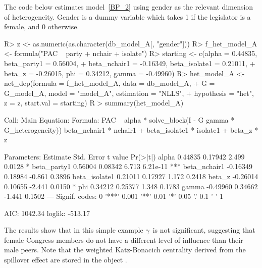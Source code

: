 \documentclass[nojss]{jss}
\begin{document}
The code below estimates model~\ref{BP_2} using gender as the
relevant dimension of heterogeneity. Gender is a dummy variable
which takes 1 if the legislator is a female, and 0 otherwise. 
\begin{CodeChunk}
\begin{CodeInput}
R> z <- as.numeric(as.character(db_model_A[, "gender"]))
R> f_het_model_A <- formula("PAC ~ party + nchair + isolate")
R> starting <- c(alpha = 0.44835, beta_party1 = 0.56004,
+    beta_nchair1 = -0.16349, beta_isolate1 = 0.21011,
+    beta_z = -0.26015, phi = 0.34212, gamma = -0.49960)
R> het_model_A <- net_dep(formula = f_het_model_A, data = db_model_A,
+    G = G_model_A, model = "model_A", estimation = "NLLS",
+    hypothesis = "het", z = z, start.val = starting)
R > summary(het_model_A)
\end{CodeInput}
\begin{CodeOutput}
Call:
Main Equation:  
Formula: PAC ~ alpha * solve_block(I - G %
gamma * G_heterogeneity)) %
beta_nchair1 * nchair1 + beta_isolate1 * isolate1 + beta_z * z

Parameters:
	      Estimate Std. Error t value Pr(>|t|)    
alpha          0.44835    0.17942   2.499   0.0128 *  
beta_party1    0.56004    0.08342   6.713 6.21e-11 ***
beta_nchair1  -0.16349    0.18984  -0.861   0.3896    
beta_isolate1  0.21011    0.17927   1.172   0.2418    
beta_z        -0.26014    0.10655  -2.441   0.0150 *  
phi            0.34212    0.25377   1.348   0.1783    
gamma         -0.49960    0.34662  -1.441   0.1502    
---
Signif. codes:  0 '***' 0.001 '**' 0.01 '*' 0.05 '.' 0.1 ' ' 1

AIC: 1042.34  loglik: -513.17
\end{CodeOutput}
\end{CodeChunk}
The results show that in this simple example $\gamma$\ is not significant, suggesting that female Congress members do not have a different level of influence than their male peers. Note that the weighted Katz-Bonacich centrality derived from the spillover effect are stored in the object .
\end{document}
